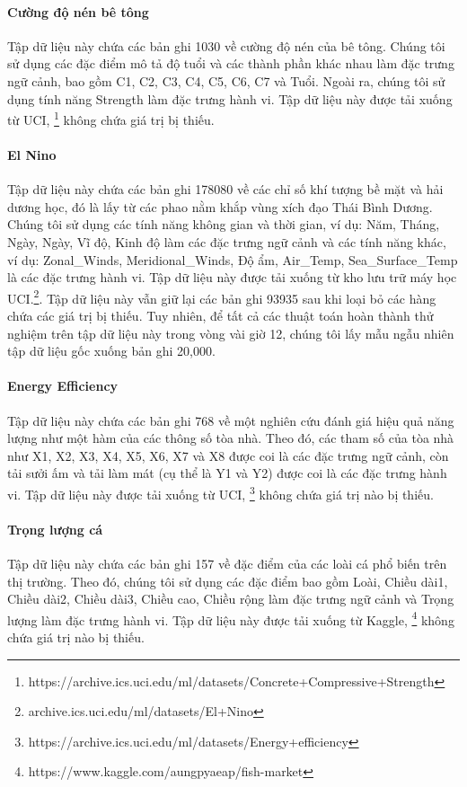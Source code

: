 \paragraph{Cường độ nén bê tông } Tập dữ liệu này chứa các bản ghi 1030 về cường độ nén của bê tông. Chúng tôi sử dụng các đặc điểm mô tả độ tuổi và các thành phần khác nhau làm đặc trưng ngữ cảnh, bao gồm C1, C2, C3, C4, C5, C6, C7 và Tuổi. Ngoài ra, chúng tôi sử dụng tính năng Strength làm đặc trưng hành vi. Tập dữ liệu này được tải xuống từ UCI, \footnote{https://archive.ics.uci.edu/ml/datasets/Concrete+Compressive+Strength} không chứa giá trị bị thiếu.

\paragraph{El Nino } Tập dữ liệu này chứa các bản ghi 178080 về các chỉ số khí tượng bề mặt và hải dương học, đó là
lấy từ các phao nằm khắp vùng xích đạo Thái Bình Dương. Chúng tôi sử dụng các tính năng không gian và thời gian, ví dụ: Năm, Tháng, Ngày, Ngày, Vĩ độ, Kinh độ làm các đặc trưng ngữ cảnh và các tính năng khác, ví dụ: Zonal\_Winds, Meridional\_Winds, Độ ẩm, Air\_Temp, Sea\_Surface\_Temp là các đặc trưng hành vi. Tập dữ liệu này được tải xuống từ kho lưu trữ máy học UCI.\footnote{archive.ics.uci.edu/ml/datasets/El+Nino}. Tập dữ liệu này vẫn giữ lại các bản ghi 93935 sau khi loại bỏ các hàng chứa các giá trị bị thiếu. Tuy nhiên, để tất cả các thuật toán hoàn thành thử nghiệm trên tập dữ liệu này trong vòng vài giờ 12, chúng tôi lấy mẫu ngẫu nhiên tập dữ liệu gốc xuống bản ghi 20,000.

\paragraph{Energy Efficiency} Tập dữ liệu này chứa các bản ghi 768 về một nghiên cứu đánh giá hiệu quả năng lượng như một hàm của các thông số tòa nhà. Theo đó, các tham số của tòa nhà như X1, X2, X3, X4, X5, X6, X7 và X8 được coi là các đặc trưng ngữ cảnh, còn tải sưởi ấm và tải làm mát (cụ thể là Y1 và Y2) được coi là các đặc trưng hành vi. Tập dữ liệu này được tải xuống từ UCI, \footnote{https://archive.ics.uci.edu/ml/datasets/Energy+efficiency} không chứa giá trị nào bị thiếu.\paragraph{Trọng lượng cá } Tập dữ liệu này chứa các bản ghi 157 về đặc điểm của các loài cá phổ biến trên thị trường. Theo đó, chúng tôi sử dụng các đặc điểm bao gồm Loài, Chiều dài1, Chiều dài2, Chiều dài3, Chiều cao, Chiều rộng làm đặc trưng ngữ cảnh và Trọng lượng làm đặc trưng hành vi. Tập dữ liệu này được tải xuống từ Kaggle, \footnote{https://www.kaggle.com/aungpyaeap/fish-market} không chứa giá trị nào bị thiếu.

